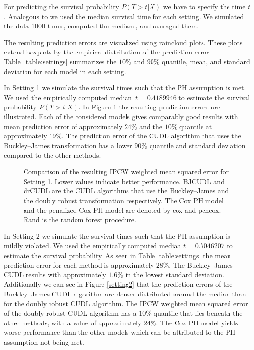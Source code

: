 \documentclass[12pt, a4paper]{scrartcl}
\theoremstyle{definition}
\theoremstyle{plain}
\numberwithin{equation}{section}
\numberwithin{figure}{section}
\numberwithin{table}{section}
\begin{document}
	For predicting the survival probability $P(T>t\vert X)$ we have to specify the time $t$.
	Analogous to \citet*{basearticle} we used the median survival time for each setting.
	We simulated the data 1000 times, computed the medians, and averaged them.
	
	The resulting prediction errors are visualized using raincloud plots.
	These plots extend boxplots by the empirical distribution of the prediction error.
	Table~\ref{table:settings} summarizes the $10\%$ and $90\%$ quantile, mean, and standard deviation for each model in each setting.
	
	In Setting 1 we simulate the survival times such that the PH assumption is met.
	We used the empirically computed median~$t = 0.4189946$ to estimate the survival probability $P(T>t\vert X)$.
	In Figure \ref{setting1} the resulting prediction errors are illustrated.
	Each of the considered models gives comparably good results with mean prediction error of approximately $24\%$ and the $10\%$ quantile at approximately $19\%$.
	The prediction error of the CUDL algorithm that uses the Buckley--James transformation has a lower $90\%$ quantile and standard deviation compared to the other methods.
	\begin{figure}
		\centering	
		
		\vspace{-0.3cm}
		\caption{Comparison of the resulting IPCW weighted mean squared error for Setting 1. Lower values indicate better performance. BJCUDL and drCUDL are the CUDL algorithms that use the Buckley--James and the doubly robust transformation respectively. The Cox PH model and the penalized Cox PH model are denoted by cox and pencox. Rand is the random forest procedure.}
		\label{setting1}
 	\end{figure}
	
	In Setting 2 we simulate the survival times such that the PH assumption is mildly violated.
	We used the empirically computed median $t = 0.7046207$ to estimate the survival probability.
	As seen in Table \ref{table:settings} the mean prediction error for each method is approximately $28\%$.
	The Buckley--James CUDL results with approximately $1.6\%$ in the lowest standard deviation.
	Additionally we can see in Figure \ref{setting2} that the prediction errors of the Buckley--James CUDL algorithm are denser distributed around the median than for the doubly robust CUDL algorithm.
	The IPCW weighted mean squared error of the doubly robust CUDL algorithm has a $10\%$ quantile that lies beneath the other methods, with a value of approximately $24\%$.
	The Cox PH model yields worse performance than the other models which can be attributed to the PH assumption not being met.
\end{document}
